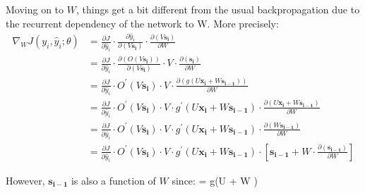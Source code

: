 Moving on to $W$, things get a bit different from the usual backpropagation due to the recurrent dependency of the
network to W. More precisely:
{\setlength{\jot}{5pt}
\begin{align*}
\nabla_W J(y_i, \hat{y}_i ; \theta)& = \frac{\partial J}{\partial \hat{y}_i}
\cdot \frac{\partial \hat{y}_i}{\partial (V \boldsymbol{s_i})} \cdot \frac{\partial (V\boldsymbol{s_i})}{\partial W} \\
&= \frac{\partial J}{\partial \hat{y}_i} \cdot \frac{ \partial ( O(V\boldsymbol{s_i}))}{\partial (V\boldsymbol{s_i})}
\cdot V \cdot \frac{\partial (\boldsymbol{s_{i}})} {\partial W} \\
&= \frac{\partial J}{\partial \hat{y}_i} \cdot O^\prime(V\boldsymbol{s_i})
\cdot V \cdot \frac{\partial (g(U \boldsymbol{x_i} + W \boldsymbol{s_{i-1}}))} {\partial W} \\
&= \frac{\partial J}{\partial \hat{y}_i} \cdot O^\prime(V \boldsymbol{s_i})
\cdot V \cdot g^\prime(U \boldsymbol{x_i} + W \boldsymbol{s_{i-1}})
\cdot \frac{\partial (U\boldsymbol{x_i} + W \boldsymbol{s_{i-1}})} {\partial W} \\
& = \frac{\partial J}{\partial \hat{y}_i} \cdot O^\prime(V\boldsymbol{s_i})
\cdot V \cdot g^\prime(U \boldsymbol{x_i} + W \boldsymbol{s_{i-1}})
\cdot \frac{\partial (W\boldsymbol{s_{i-1}})} {\partial W} \\
& = \frac{\partial J}{\partial \hat{y}_i} \cdot O^\prime(V \boldsymbol{s_i})
\cdot V \cdot g^\prime(U \boldsymbol{x_i} + W \boldsymbol{s_{i-1}})
\cdot \left[ \boldsymbol{s_{i-1}} + W \cdot \frac{\partial(\boldsymbol{s_{i-1}})} {\partial W} \right]
\end{align*}}

However, $\boldsymbol{s_{i-1}}$ is also a function of $W$ since:
\bse
{}= g(U  + W )
\ese

